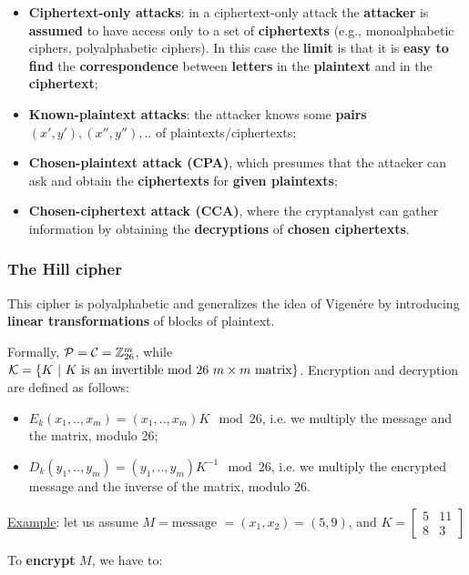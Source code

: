 \begin{itemize}
    \item \textbf{Ciphertext-only attacks}: in a ciphertext-only attack the \textbf{attacker} is \textbf{assumed} to have access only to a set of \textbf{ciphertexts} (e.g., monoalphabetic ciphers, polyalphabetic ciphers). In this case the \textbf{limit} is that it is \textbf{easy to find} the \textbf{correspondence} between \textbf{letters} in the \textbf{plaintext} and in the \textbf{ciphertext};
    \item \textbf{Known-plaintext attacks}: the attacker knows some \textbf{pairs} $(x',y'), (x'', y''), ..$ of plaintexts/ciphertexts;
    \item \textbf{Chosen-plaintext attack (CPA)}, which presumes that the attacker can ask and obtain the \textbf{ciphertexts} for \textbf{given plaintexts};
    \item \textbf{Chosen-ciphertext attack (CCA)}, where the cryptanalyst can gather information by obtaining the \textbf{decryptions} of \textbf{chosen ciphertexts}. 
\end{itemize}

\subsubsection{The Hill cipher}
This cipher is polyalphabetic and generalizes the idea of Vigenére by introducing \textbf{linear transformations} of blocks of plaintext. 

Formally, ${\cal P} = {\cal C} = \mathbb{Z}_{26}^m$, while ${\cal K} = \{ K \ | \ K  \text{ is an invertible mod 26 } m\times m \text{ matrix} \}$. Encryption and decryption are defined as follows:

\begin{itemize}
    \item $E_k (x_1, .., x_m) = (x_1, .., x_m) K \mod 26$, i.e. we multiply the message and the matrix, modulo 26;
    \item $D_k (y_1, .., y_m) = (y_1, .., y_m) K^{-1} \mod 26$, i.e. we multiply the encrypted message and the inverse of the matrix, modulo 26.
\end{itemize}

\underline{Example}: let us assume $M = \text{message } = (x_1, x_2) = (5,9)$, and $
K = \begin{bmatrix}
5 & 11 \\
8 & 3 
\end{bmatrix}
$

To \textbf{encrypt} $M$, we have to:

